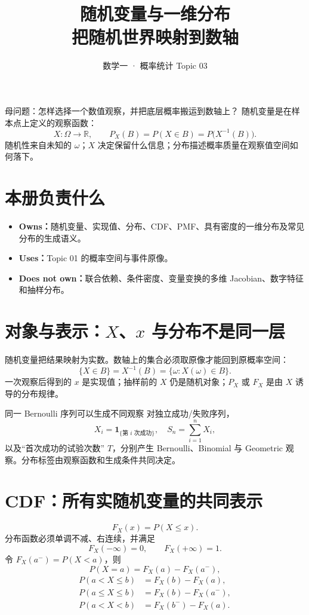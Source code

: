 \documentclass[11pt,a4paper]{ctexart}
\title{\vspace{-1.1cm}\textbf{随机变量与一维分布}\\[0.4em]\large 把随机世界映射到数轴}
\author{数学一 · 概率统计 Topic 03}\date{}
\newcommand{\kw}[1]{\textbf{\color{deep}#1}}
\begin{document}
\maketitle

\begin{corebox}{母问题：怎样选择一个数值观察，并把底层概率搬运到数轴上？}
随机变量是在样本点上定义的观察函数：
\[
\boxed{X:\Omega\to\mathbb R},\qquad P_X(B)=P(X\in B)=P\bigl(X^{-1}(B)\bigr).
\]
随机性来自未知的 $\omega$；$X$ 决定保留什么信息；分布描述概率质量在观察值空间如何落下。
\end{corebox}

\section{本册负责什么}
\begin{itemize}
\item \kw{Owns：}随机变量、实现值、分布、CDF、PMF、具有密度的一维分布及常见分布的生成语义。
\item \kw{Uses：}Topic 01 的概率空间与事件原像。
\item \kw{Does not own：}联合依赖、条件密度、变量变换的多维 Jacobian、数字特征和抽样分布。
\end{itemize}

\section{对象与表示：$X$、$x$ 与分布不是同一层}
随机变量把结果映射为实数。数轴上的集合必须取原像才能回到原概率空间：
\[
\{X\in B\}=X^{-1}(B)=\{\omega:X(\omega)\in B\}.
\]
一次观察后得到的 $x$ 是实现值；抽样前的 $X$ 仍是随机对象；$P_X$ 或 $F_X$ 是由 $X$ 诱导的分布规律。

\begin{methodbox}{同一 Bernoulli 序列可以生成不同观察}
对独立成功/失败序列，
\[
X_i=\mathbf1_{\{\text{第 }i\text{ 次成功}\}},\quad S_n=\sum_{i=1}^nX_i,
\]
以及“首次成功的试验次数” $T$，分别产生 Bernoulli、Binomial 与 Geometric 观察。分布标签由观察函数和生成条件共同决定。
\end{methodbox}

\section{CDF：所有实随机变量的共同表示}
\[
\boxed{F_X(x)=P(X\le x)}.
\]
分布函数必须单调不减、右连续，并满足
\[
F_X(-\infty)=0,\qquad F_X(+\infty)=1.
\]
令 $F_X(a^-)=P(X<a)$，则
\[
P(X=a)=F_X(a)-F_X(a^-),
\]
\[
\begin{aligned}
P(a<X\le b)&=F_X(b)-F_X(a),\\
P(a\le X\le b)&=F_X(b)-F_X(a^-),\\
P(a<X<b)&=F_X(b^-)-F_X(a).
\end{aligned}
\]
\end{document}
